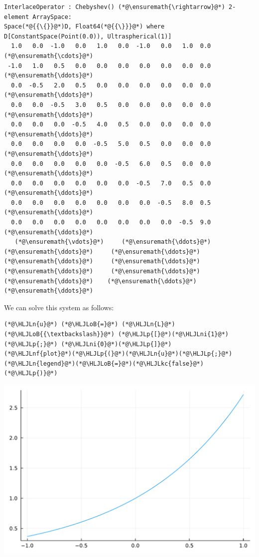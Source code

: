 \documentclass[12pt,a4paper]{article}
\newcommand{\HLJLkc}[1]{\textcolor[RGB]{59,151,46}{\textit{#1}}}
\newcommand{\HLJLn}[1]{#1}
\newcommand{\HLJLnf}[1]{\textcolor[RGB]{66,102,213}{#1}}
\newcommand{\HLJLni}[1]{\textcolor[RGB]{59,151,46}{#1}}
\newcommand{\HLJLoB}[1]{\textcolor[RGB]{102,102,102}{\textbf{#1}}}
\newcommand{\HLJLp}[1]{#1}
\begin{document}
\begin{lstlisting}
InterlaceOperator : Chebyshev() (*@\ensuremath{\rightarrow}@*) 2-element ArraySpace:
Space(*@{{\{}}@*)D, Float64(*@{{\}}}@*) where D[ConstantSpace(Point(0.0)), Ultraspherical(1)]
  1.0   0.0  -1.0   0.0   1.0   0.0  -1.0   0.0   1.0  0.0  (*@\ensuremath{\cdots}@*)
 -1.0   1.0   0.5   0.0   0.0   0.0   0.0   0.0   0.0  0.0  (*@\ensuremath{\ddots}@*)
  0.0  -0.5   2.0   0.5   0.0   0.0   0.0   0.0   0.0  0.0  (*@\ensuremath{\ddots}@*)
  0.0   0.0  -0.5   3.0   0.5   0.0   0.0   0.0   0.0  0.0  (*@\ensuremath{\ddots}@*)
  0.0   0.0   0.0  -0.5   4.0   0.5   0.0   0.0   0.0  0.0  (*@\ensuremath{\ddots}@*)
  0.0   0.0   0.0   0.0  -0.5   5.0   0.5   0.0   0.0  0.0  (*@\ensuremath{\ddots}@*)
  0.0   0.0   0.0   0.0   0.0  -0.5   6.0   0.5   0.0  0.0  (*@\ensuremath{\ddots}@*)
  0.0   0.0   0.0   0.0   0.0   0.0  -0.5   7.0   0.5  0.0  (*@\ensuremath{\ddots}@*)
  0.0   0.0   0.0   0.0   0.0   0.0   0.0  -0.5   8.0  0.5  (*@\ensuremath{\ddots}@*)
  0.0   0.0   0.0   0.0   0.0   0.0   0.0   0.0  -0.5  9.0  (*@\ensuremath{\ddots}@*)
   (*@\ensuremath{\vdots}@*)     (*@\ensuremath{\ddots}@*)     (*@\ensuremath{\ddots}@*)     (*@\ensuremath{\ddots}@*)     (*@\ensuremath{\ddots}@*)     (*@\ensuremath{\ddots}@*)     (*@\ensuremath{\ddots}@*)     (*@\ensuremath{\ddots}@*)     (*@\ensuremath{\ddots}@*)    (*@\ensuremath{\ddots}@*)   (*@\ensuremath{\ddots}@*)
\end{lstlisting}


We can solve this system as follows:


\begin{lstlisting}
(*@\HLJLn{u}@*) (*@\HLJLoB{=}@*) (*@\HLJLn{L}@*) (*@\HLJLoB{{\textbackslash}}@*) (*@\HLJLp{[}@*)(*@\HLJLni{1}@*)(*@\HLJLp{;}@*) (*@\HLJLni{0}@*)(*@\HLJLp{]}@*)
(*@\HLJLnf{plot}@*)(*@\HLJLp{(}@*)(*@\HLJLn{u}@*)(*@\HLJLp{;}@*)(*@\HLJLn{legend}@*)(*@\HLJLoB{=}@*)(*@\HLJLkc{false}@*)(*@\HLJLp{)}@*)
\end{lstlisting}

\includegraphics[width=\linewidth]{jl_hpkPoK/OP_methods_test_37_1.pdf}
\end{document}
